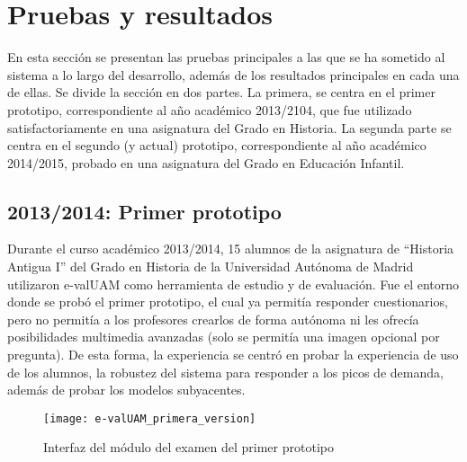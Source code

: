 \chapter{Pruebas y resultados\label{sec:pruebasYResultados}}

En esta sección se presentan las pruebas principales a las que se ha sometido al sistema a lo largo del desarrollo, además de los resultados principales en cada una de ellas. Se divide la sección en dos partes. La primera, se centra en el primer prototipo, correspondiente al año académico 2013/2104, que fue utilizado satisfactoriamente en una asignatura del Grado en Historia. La segunda parte se centra en el segundo (y actual) prototipo, correspondiente al año académico 2014/2015, probado en una asignatura del Grado en Educación Infantil.


\section{2013/2014: Primer prototipo}


Durante el curso académico 2013/2014, 15 alumnos de la asignatura de ``Historia Antigua I'' del Grado en Historia de la Universidad Autónoma de Madrid utilizaron \acrshort{e-valUAM} como herramienta de estudio y de evaluación. Fue el entorno donde se probó el primer prototipo, el cual ya permitía responder cuestionarios, pero no permitía a los profesores crearlos de forma autónoma ni les ofrecía posibilidades multimedia avanzadas (solo se permitía una imagen opcional por pregunta). De esta forma, la experiencia se centró en probar la experiencia de uso de los alumnos, la robustez del sistema para responder a los picos de demanda, además de probar los modelos subyacentes.

\begin{figure}[htp!]
	\centering
	\texttt{[image: e-valUAM\_primera\_version]}
	\caption{Interfaz del módulo del examen del primer prototipo}
	\label{fig:e-valUAM primera version}
\end{figure}

